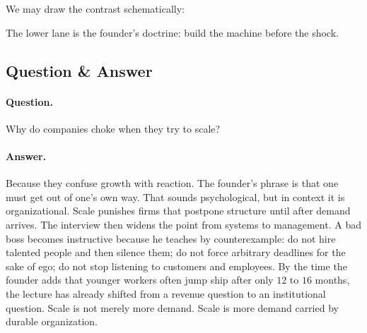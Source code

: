 We may draw the contrast schematically:

\begin{figure}[h]
\centering
{}
\end{figure}

The lower lane is the founder's doctrine: build the machine before the shock.

\subsection{Question \& Answer}

\paragraph{Question.} Why do companies choke when they try to scale?

\paragraph{Answer.} Because they confuse growth with reaction. The founder's phrase is that one must get out of one's own way. That sounds psychological, but in context it is organizational. Scale punishes firms that postpone structure until after demand arrives. The interview then widens the point from systems to management. A bad boss becomes instructive because he teaches by counterexample: do not hire talented people and then silence them; do not force arbitrary deadlines for the sake of ego; do not stop listening to customers and employees. By the time the founder adds that younger workers often jump ship after only \(12\) to \(16\) months, the lecture has already shifted from a revenue question to an institutional question. Scale is not merely more demand. Scale is more demand carried by durable organization.


